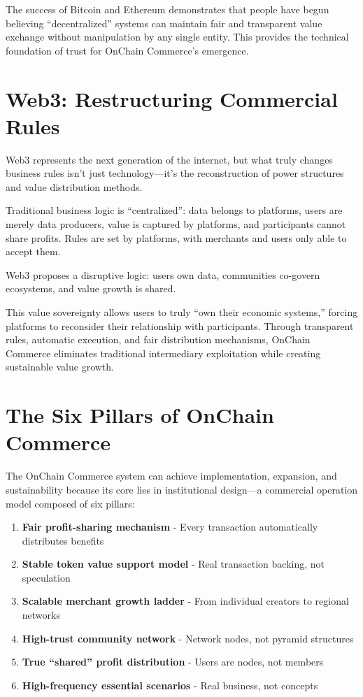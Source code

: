 \documentclass[
  Letterpaper,
]{scrbook}
\providecommand{\tightlist}{%
  \setlength{\itemsep}{0pt}\setlength{\parskip}{0pt}}
\begin{document}
The success of Bitcoin and Ethereum demonstrates that people have begun
believing ``decentralized'' systems can maintain fair and transparent
value exchange without manipulation by any single entity. This provides
the technical foundation of trust for OnChain Commerce's emergence.

\section{Web3: Restructuring Commercial
Rules}\label{web3-restructuring-commercial-rules}

Web3 represents the next generation of the internet, but what truly
changes business rules isn't just technology---it's the reconstruction
of power structures and value distribution methods.

Traditional business logic is ``centralized'': data belongs to
platforms, users are merely data producers, value is captured by
platforms, and participants cannot share profits. Rules are set by
platforms, with merchants and users only able to accept them.

Web3 proposes a disruptive logic: users own data, communities co-govern
ecosystems, and value growth is shared.

This value sovereignty allows users to truly ``own their economic
systems,'' forcing platforms to reconsider their relationship with
participants. Through transparent rules, automatic execution, and fair
distribution mechanisms, OnChain Commerce eliminates traditional
intermediary exploitation while creating sustainable value growth.

\section{The Six Pillars of OnChain
Commerce}\label{the-six-pillars-of-onchain-commerce}

The OnChain Commerce system can achieve implementation, expansion, and
sustainability because its core lies in institutional design---a
commercial operation model composed of six pillars:

\begin{enumerate}
\def\labelenumi{\arabic{enumi}.}
\tightlist
\item
  \textbf{Fair profit-sharing mechanism} - Every transaction
  automatically distributes benefits
\item
  \textbf{Stable token value support model} - Real transaction backing,
  not speculation\\
\item
  \textbf{Scalable merchant growth ladder} - From individual creators to
  regional networks
\item
  \textbf{High-trust community network} - Network nodes, not pyramid
  structures
\item
  \textbf{True ``shared'' profit distribution} - Users are nodes, not
  members
\item
  \textbf{High-frequency essential scenarios} - Real business, not
  concepts
\end{enumerate}
\end{document}
